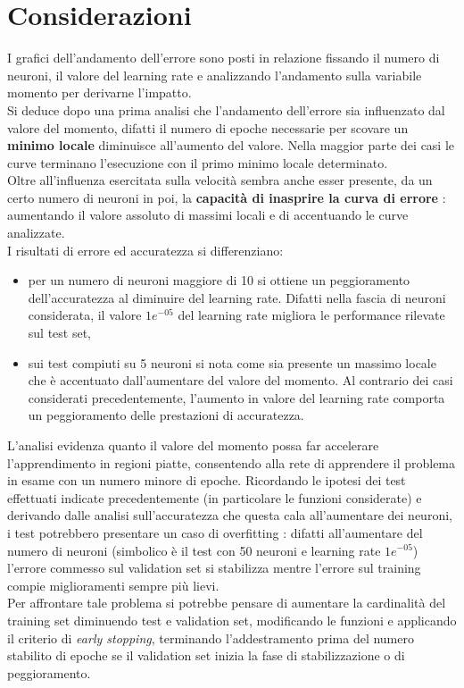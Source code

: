 {\clearpage}
\section{Considerazioni}
I grafici dell'andamento dell'errore sono posti in relazione fissando il numero di neuroni, il valore del learning rate e analizzando l'andamento sulla variabile momento per derivarne l'impatto.\\
Si deduce dopo una prima analisi che l'andamento dell'errore sia influenzato dal valore del momento, difatti il numero di epoche necessarie per scovare un \textbf{minimo locale} diminuisce all'aumento del valore. Nella maggior parte dei casi le curve terminano l'esecuzione con il primo minimo locale determinato.\\
Oltre all'influenza esercitata sulla velocità sembra anche esser presente, da un certo numero di neuroni in poi, la \textbf{capacità di inasprire la curva di errore} : aumentando il valore assoluto di massimi locali e di accentuando le curve analizzate. \\
I risultati di errore ed accuratezza si differenziano:
\begin{itemize}
    \item per un numero di neuroni maggiore di 10 si ottiene un peggioramento dell'accuratezza al diminuire del learning rate. Difatti nella fascia di neuroni considerata, il valore $1e^{-05}$ del learning rate migliora le performance rilevate sul test set,
    \item sui test compiuti su 5 neuroni si nota come sia presente un massimo locale che è accentuato dall'aumentare del valore del momento. Al contrario dei casi considerati precedentemente, l'aumento in valore del learning rate comporta un peggioramento delle prestazioni di accuratezza.
\end{itemize}
L'analisi evidenza quanto il valore del momento possa far accelerare l'apprendimento in regioni piatte, consentendo alla rete di apprendere il problema in esame con un numero minore di epoche.
Ricordando le ipotesi dei test effettuati indicate precedentemente (in particolare le funzioni considerate) e derivando dalle analisi sull'accuratezza che questa cala all'aumentare dei neuroni, i test potrebbero presentare un caso di overfitting : difatti all'aumentare del numero di neuroni (simbolico è il test con 50 neuroni e learning rate $1e^{-05}$) l'errore commesso sul validation set si stabilizza mentre l'errore sul training compie miglioramenti sempre più lievi.\\
Per affrontare tale problema si potrebbe pensare di aumentare la cardinalità del training set diminuendo  test e validation set, modificando le funzioni e applicando il criterio di \textit{early stopping}, terminando l'addestramento prima del numero stabilito di epoche se il validation set inizia la fase di stabilizzazione o di peggioramento.\\
